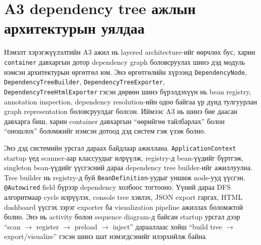 \section{A3 dependency tree ажлын архитектурын уялдаа}

Нэмэлт хэрэгжүүлэлтийн A3 ажил нь layered architecture-ийг өөрчлөх бус, харин \texttt{container} давхаргын дотор dependency graph боловсруулах шинэ дэд модуль нэмсэн архитектурын өргөтгөл юм. Энэ өргөтгөлийн хүрээнд \texttt{DependencyNode}, \texttt{DependencyTreeBuilder}, \texttt{DependencyTreeExporter}, \texttt{DependencyTreeHtmlExporter} гэсэн дөрвөн шинэ бүрэлдэхүүн нь bean registry, annotation inspection, dependency resolution-ийн одоо байгаа үр дүнд тулгуурлан graph representation боловсруулдаг болсон. Иймээс A3 нь шинэ бие даасан давхарга биш, харин container давхаргын ``өөрийгөө тайлбарлах'' болон ``оношлох'' боломжийг нэмсэн дотоод дэд систем гэж үзэж болно.

Энэ дэд системийн урсгал дараах байдлаар ажиллана. \texttt{ApplicationContext} startup үед scanner-аар классуудыг илрүүлж, registry-д bean-үүдийг бүртгэж, singleton bean-үүдийг үүсгэсний дараа dependency tree builder-ийг ажиллуулна. Tree builder нь registry-д буй \texttt{BeanDefinition}-уудыг уншиж node-ууд үүсгэн, \texttt{@Autowired} field бүрээр dependency холбоос тогтооно. Үүний дараа DFS алгоритмаар cycle илрүүлэх, console tree хэвлэх, JSON export гаргах, HTML dashboard үүсгэх зэрэг exporter ба visualization pipeline ажиллах боломжтой болно. Энэ нь activity болон sequence diagram-д байсан startup урсгал дээр ``scan $\rightarrow$ register $\rightarrow$ preload $\rightarrow$ inject'' дарааллаас хойш ``build tree $\rightarrow$ export/visualize'' гэсэн шинэ шат нэмэгдсэнийг илэрхийлж байна.

